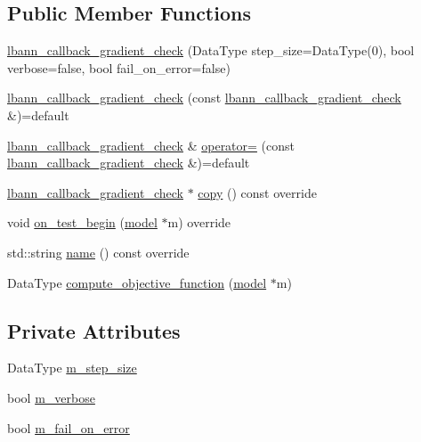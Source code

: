 \subsection*{Public Member Functions}
\begin{DoxyCompactItemize}
\item 
\hyperlink{classlbann_1_1lbann__callback__gradient__check_ae198159c613bb05e00f49b824a61afbb}{lbann\+\_\+callback\+\_\+gradient\+\_\+check} (Data\+Type step\+\_\+size=Data\+Type(0), bool verbose=false, bool fail\+\_\+on\+\_\+error=false)
\item 
\hyperlink{classlbann_1_1lbann__callback__gradient__check_accd5a7f087c5bf782f17b428cfb75bdb}{lbann\+\_\+callback\+\_\+gradient\+\_\+check} (const \hyperlink{classlbann_1_1lbann__callback__gradient__check}{lbann\+\_\+callback\+\_\+gradient\+\_\+check} \&)=default
\item 
\hyperlink{classlbann_1_1lbann__callback__gradient__check}{lbann\+\_\+callback\+\_\+gradient\+\_\+check} \& \hyperlink{classlbann_1_1lbann__callback__gradient__check_a937cc9192005451b8e059b935533cecc}{operator=} (const \hyperlink{classlbann_1_1lbann__callback__gradient__check}{lbann\+\_\+callback\+\_\+gradient\+\_\+check} \&)=default
\item 
\hyperlink{classlbann_1_1lbann__callback__gradient__check}{lbann\+\_\+callback\+\_\+gradient\+\_\+check} $\ast$ \hyperlink{classlbann_1_1lbann__callback__gradient__check_a3cf248258a45ee721907864d62a17355}{copy} () const override
\item 
void \hyperlink{classlbann_1_1lbann__callback__gradient__check_ab62102d5ab30330386514161b9ee6586}{on\+\_\+test\+\_\+begin} (\hyperlink{classlbann_1_1model}{model} $\ast$m) override
\item 
std\+::string \hyperlink{classlbann_1_1lbann__callback__gradient__check_ad068bba7a10853f38cc9f58867dc468b}{name} () const override
\item 
Data\+Type \hyperlink{classlbann_1_1lbann__callback__gradient__check_a54ba40dd3b381d5c889d77edeffa37f9}{compute\+\_\+objective\+\_\+function} (\hyperlink{classlbann_1_1model}{model} $\ast$m)
\end{DoxyCompactItemize}
\subsection*{Private Attributes}
\begin{DoxyCompactItemize}
\item 
Data\+Type \hyperlink{classlbann_1_1lbann__callback__gradient__check_ab324dbfc7d21b69f135d33ee8290c4b2}{m\+\_\+step\+\_\+size}
\item 
bool \hyperlink{classlbann_1_1lbann__callback__gradient__check_a9a8669004ccfc3b76963ba13252600d3}{m\+\_\+verbose}
\item 
bool \hyperlink{classlbann_1_1lbann__callback__gradient__check_ac05a23972812866458fff241de0bb324}{m\+\_\+fail\+\_\+on\+\_\+error}
\end{DoxyCompactItemize}
